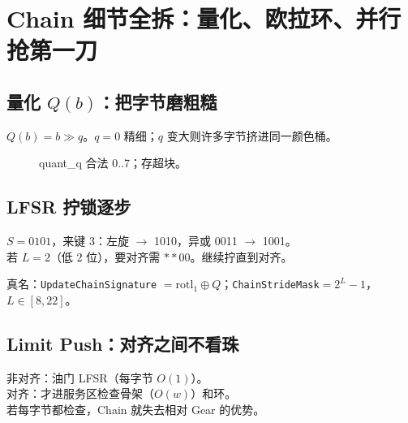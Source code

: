 \chapter{Chain 细节全拆：量化、欧拉环、并行抢第一刀}
\label{ch:chain-details}

\section{量化 $Q(b)$：把字节磨粗糙}

$Q(b)=b\gg q$。$q=0$ 精细；$q$ 变大则许多字节挤进同一颜色桶。

\begin{figure}[htbp]
\centering
{}
\caption{quant\_q 合法 0..7；存超块。}
\label{fig:quant}
\end{figure}

\section{LFSR 拧锁逐步}

\begin{toybox}[4 位示意]
$S=0101$，来键 3：左旋 $\to$ 1010，异或 0011 $\to$ 1001。\\
若 $L=2$（低 2 位），要对齐需 $**00$。继续拧直到对齐。
\end{toybox}

真名：\texttt{UpdateChainSignature} $=\mathrm{rotl}_1\oplus Q$；\texttt{ChainStrideMask}$=2^L-1$，$L\in[8,22]$。

\section{Limit Push：对齐之间不看珠}

\begin{metaphor}[高速公路服务区]
非对齐：油门 LFSR（每字节 $O(1)$）。\\
对齐：才进服务区检查骨架（$O(w)$）和环。\\
若每字节都检查，Chain 就失去相对 Gear 的优势。
\end{metaphor}

